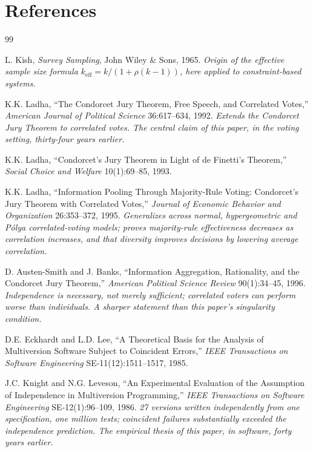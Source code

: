 \documentclass[11pt,a4paper]{article}
\theoremstyle{definition}
\theoremstyle{remark}
\begin{document}
\section*{References}

\begin{thebibliography}{99}

L. Kish, \textit{Survey Sampling}, John Wiley \& Sons, 1965.
\textit{Origin of the effective sample size formula $k_{\text{eff}} = k/(1+\rho(k-1))$, here applied to constraint-based systems.}

K.K. Ladha, ``The Condorcet Jury Theorem, Free Speech, and Correlated Votes,'' \textit{American Journal of Political Science} 36:617--634, 1992.
\textit{Extends the Condorcet Jury Theorem to correlated votes. The central claim of this paper, in the voting setting, thirty-four years earlier.}

K.K. Ladha, ``Condorcet's Jury Theorem in Light of de Finetti's Theorem,'' \textit{Social Choice and Welfare} 10(1):69--85, 1993.

K.K. Ladha, ``Information Pooling Through Majority-Rule Voting: Condorcet's Jury Theorem with Correlated Votes,'' \textit{Journal of Economic Behavior and Organization} 26:353--372, 1995.
\textit{Generalizes across normal, hypergeometric and P\'olya correlated-voting models; proves majority-rule effectiveness decreases as correlation increases, and that diversity improves decisions by lowering average correlation.}

D. Austen-Smith and J. Banks, ``Information Aggregation, Rationality, and the Condorcet Jury Theorem,'' \textit{American Political Science Review} 90(1):34--45, 1996.
\textit{Independence is necessary, not merely sufficient; correlated voters can perform worse than individuals. A sharper statement than this paper's singularity condition.}

D.E. Eckhardt and L.D. Lee, ``A Theoretical Basis for the Analysis of Multiversion Software Subject to Coincident Errors,'' \textit{IEEE Transactions on Software Engineering} SE-11(12):1511--1517, 1985.

J.C. Knight and N.G. Leveson, ``An Experimental Evaluation of the Assumption of Independence in Multiversion Programming,'' \textit{IEEE Transactions on Software Engineering} SE-12(1):96--109, 1986.
\textit{27 versions written independently from one specification, one million tests; coincident failures substantially exceeded the independence prediction. The empirical thesis of this paper, in software, forty years earlier.}


\end{thebibliography}
\end{document}
